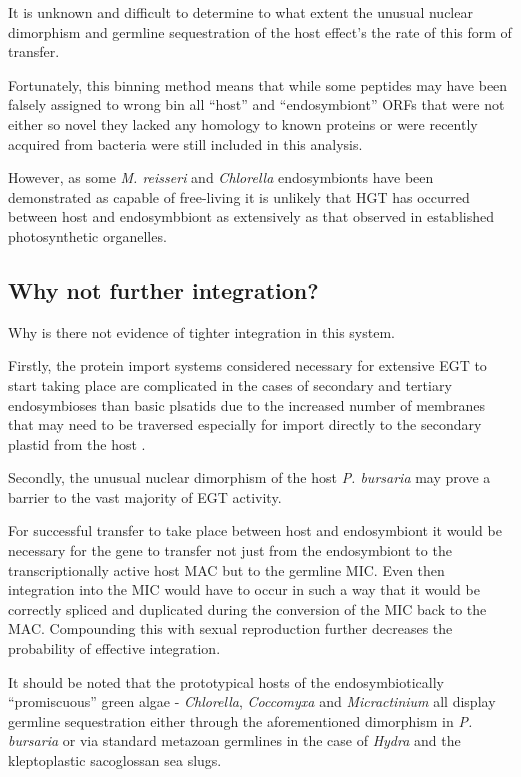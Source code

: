 It is unknown and difficult to determine to what extent the 
unusual nuclear dimorphism and germline sequestration of the host 
effect's the rate of this form of transfer. 

Fortunately, this binning method means that while some peptides
may have been falsely assigned to wrong bin all ``host'' and
``endosymbiont'' ORFs that were not either so novel they lacked
any homology to known proteins or were recently acquired from
bacteria were still included in this analysis. 

However, as some \textit{M. reisseri} and \textit{Chlorella} endosymbionts 
have been demonstrated as capable of free-living it is unlikely
that HGT has occurred between host and endosymbbiont as extensively
as that observed in established photosynthetic organelles. 



\subsection{Why not further integration?}

Why is there not evidence of tighter integration in this system.


Firstly, the protein import systems considered necessary for extensive
EGT to start taking place are complicated
in the cases of secondary and tertiary endosymbioses
than basic plsatids due to the increased number
of membranes that may need to be traversed especially
for import directly to the secondary plastid from the
host \citep{Hirakawa2012}.


Secondly, the unusual nuclear dimorphism of the host \textit{P. bursaria}
may prove a barrier to the vast majority of EGT activity. 

For successful transfer to take place between host and endosymbiont it
would be necessary for the gene to transfer not just from the 
endosymbiont to the transcriptionally active host MAC but to the germline
MIC.  Even then integration into the MIC would have to occur in such a way
that it would be correctly spliced and duplicated during the conversion of the MIC
back to the MAC.
Compounding this with sexual reproduction further decreases the probability of
effective integration.



It should be noted that the prototypical hosts of the endosymbiotically ``promiscuous''
green algae - \textit{Chlorella}, \textit{Coccomyxa} and \textit{Micractinium} 
all display germline sequestration either through the aforementioned dimorphism
in \textit{P. bursaria} or via standard metazoan germlines in the case of
\textit{Hydra} and the kleptoplastic sacoglossan sea slugs. 





